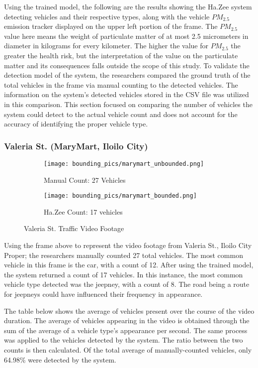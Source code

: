 Using the trained model,  the following are the results showing the Ha.Zee system detecting vehicles and their respective types, along with the vehicle $PM_{2.5}$ emission tracker displayed on the upper left portion of the frame. The $PM_{2.5}$ value here means the weight of particulate matter of at most 2.5 micrometers in diameter in kilograms for every kilometer. The higher the value for $PM_{2.5}$ the greater the health risk, but the interpretation of the value on the particulate matter and its consequences falls outside the scope of this study.  To validate the detection model of the system, the researchers compared the ground truth of the total vehicles in the frame via manual counting to the detected vehicles. The information on the system’s detected vehicles stored in the CSV file was utilized in this comparison. This section focused on comparing the number of vehicles the system could detect to the actual vehicle count and does not account for the accuracy of identifying the proper vehicle type.

\subsubsection{Valeria St. (MaryMart, Iloilo City)}


\begin{figure}[!htbp]
	\begin{subfigure}{.5\textwidth}
		\centering
		\texttt{[image: bounding\_pics/marymart\_unbounded.png]}
		\caption{Manual Count: 27 Vehicles}
		
	\end{subfigure}%
	\begin{subfigure}{.5\textwidth}
		\centering
		\texttt{[image: bounding\_pics/marymart\_bounded.png]}
		\caption{Ha.Zee Count: 17 vehicles}
	\end{subfigure}
	\caption{Valeria St. Traffic Video Footage}
\end{figure}
\FloatBarrier

Using the frame above to represent the video footage from Valeria St., Iloilo City Proper; the researchers manually counted 27 total vehicles. The most common vehicle in this frame is the car, with a count of 12. After using the trained model, the system returned a count of 17 vehicles. In this instance, the most common vehicle type detected was the jeepney, with a count of 8. The road being a route for jeepneys could have influenced their frequency in appearance.

The table below shows the average of vehicles present over the course of the video duration. The average of vehicles appearing in the video is obtained through the sum of the average of a vehicle type’s appearance per second. The same process was applied to the vehicles detected by the system. The ratio between the two counts is then calculated. Of the total average of manually-counted vehicles, only 64.98\% were detected by the system. 



